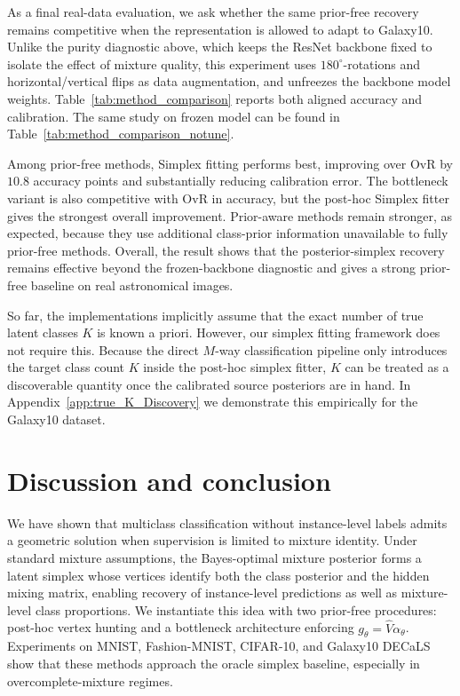 \documentclass{article}
\theoremstyle{plain}
\theoremstyle{definition}
\theoremstyle{remark}
\begin{document}
As a final real-data evaluation, we ask whether the same prior-free recovery remains competitive when the representation is allowed to adapt to Galaxy10.
Unlike the purity diagnostic above, which keeps the ResNet backbone fixed to isolate the effect of mixture quality, this experiment uses $180^\circ$-rotations and horizontal/vertical flips as data augmentation, and unfreezes the backbone model weights.
Table~\ref{tab:method_comparison} reports both aligned accuracy and calibration. The same study on frozen model can be found in Table~\ref{tab:method_comparison_notune}.

Among prior-free methods, Simplex fitting performs best, improving over OvR by $10.8$ accuracy points and substantially reducing calibration error.
The bottleneck variant is also competitive with OvR in accuracy, but the post-hoc Simplex fitter gives the strongest overall improvement.
Prior-aware methods remain stronger, as expected, because they use additional class-prior information unavailable to fully prior-free methods.
Overall, the result shows that the posterior-simplex recovery remains effective beyond the frozen-backbone diagnostic and gives a strong prior-free baseline on real astronomical images.

So far, the implementations implicitly assume that the exact number of true latent classes $K$ is known a priori. However, our simplex fitting framework does not require this.
Because the direct $M$-way classification pipeline only introduces the target class count $K$ inside the post-hoc simplex fitter, $K$ can be treated as a discoverable quantity once the calibrated source posteriors are in hand. In Appendix~\ref{app:true_K_Discovery} we demonstrate this empirically for the Galaxy10 dataset. 



\section{Discussion and conclusion}
\label{sec:discussion}

We have shown that multiclass classification without instance-level labels admits a geometric solution when supervision is limited to mixture identity. Under standard mixture assumptions, the Bayes-optimal mixture posterior forms a latent simplex whose vertices identify both the class posterior and the hidden mixing matrix, enabling recovery of instance-level predictions as well as mixture-level class proportions. We instantiate this idea with two prior-free procedures: post-hoc vertex hunting and a bottleneck architecture enforcing $g_\theta=\hat V\alpha_\theta$. Experiments on MNIST, Fashion-MNIST, CIFAR-10, and Galaxy10 DECaLS show that these methods approach the oracle simplex baseline, especially in overcomplete-mixture regimes.
\end{document}

